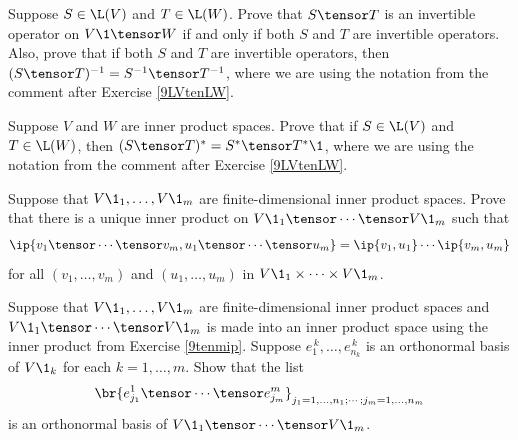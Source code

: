 \exercise
Suppose $S \in \L(V)$ and $T \in \L(W)$. Prove that $S \tensor T$ is an invertible operator on $V\1 \tensor W$ if and only if both $S$ and $T$ are invertible operators. Also, prove that  if both $S$ and $T$ are invertible operators, then
$(S \tensor T)^{-1} = S^{-1} \tensor T^{-1}$, where we are using the notation from the comment after Exercise \ref{9LVtenLW}.


\exercise
Suppose $V$ and $W$ are inner product spaces. Prove that if $S \in \L(V)$ and $T \in \L(W)$, then $(S \tensor T)^* = S^* \tensor T^*\1$, where we are using the notation from the comment after Exercise \ref{9LVtenLW}.\label{9STstar}


\exercise
Suppose that $V\1_1, \ldots, V\1_m$ are finite-dimensional inner product spaces. Prove that there is a unique inner product on
$V\1_1 \tensor \cdots \tensor V\1_m$ such that\label{9tenmip}
\[
\ip{ v_1 \tensor \cdots \tensor v_m, u_1 \tensor \cdots \tensor u_m } =
\ip{ v_1, u_1} \cdots \ip{v_m, u_m}
\]
for all $(v_1, \ldots, v_m)$ and $(u_1, \ldots, u_m)$ in $V\1_1 \times \cdots \times V\1_m$.


\exercise
Suppose that $V\1_1, \ldots, V\1_m$ are finite-dimensional inner product spaces and $V\1_1 \tensor \cdots \tensor V\1_m$ is made into an inner product space using the inner product from Exercise \ref{9tenmip}. Suppose $e_1^{\,k}, \ldots, e_{n_k}^{\,k}$ is an orthonormal basis of $V\1_k$ for each $k = 1, \ldots, m$. Show that the list\label{9tenmip2}
\[
\br{e_{j_1}^1 \tensor \cdots \tensor e_{j_m}^m}_{j_1 = 1, \ldots, n_1; \cdots ; j_m = 1, \ldots, n_m}
\]
is an orthonormal basis of $V\1_1 \tensor \cdots \tensor V\1_m$.


